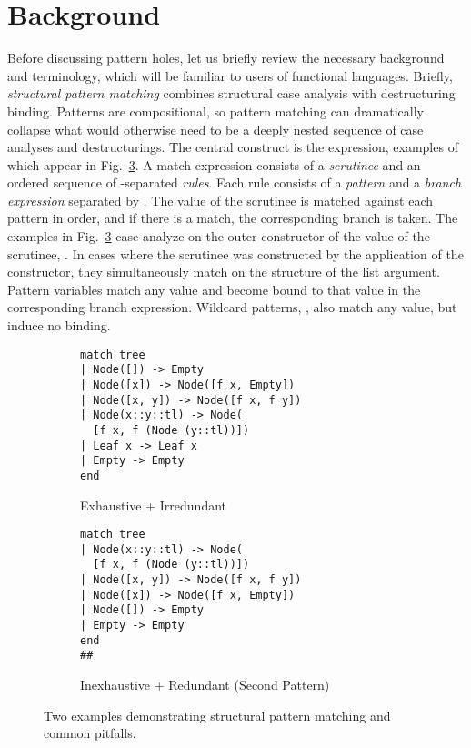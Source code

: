 \section{Background}
\label{sec:background}
Before discussing pattern holes, let us briefly review the necessary background and terminology, which will be familiar to users of functional languages. 
Briefly,
\emph{structural pattern matching} combines structural case analysis with destructuring binding. 
Patterns are compositional, so pattern matching can dramatically collapse what would otherwise 
need to be a deeply nested sequence of case analyses and destructurings. The central construct is the  expression, examples of which appear in  Fig.~\ref{fig:basic-examples}. A match expression consists of a \emph{scrutinee} and an ordered sequence of \li{|}-separated \emph{rules}. Each rule consists of a \emph{pattern} and a \emph{branch expression} separated by \li{->}. The value of the scrutinee is matched against each pattern in order, and if there is a match, the corresponding branch is taken. The examples in  Fig.~\ref{fig:basic-examples} 
case analyze on the outer constructor of the value of the {scrutinee}, . In cases where the scrutinee was constructed by the application of the  constructor, they simultaneously match on the structure of the list argument. Pattern variables match any value and become bound to that value in the corresponding branch expression. Wildcard patterns, \li{_}, also match any value, but induce no binding.

\begin{figure}
\begin{subfigure}{.45\textwidth}
\begin{lstlisting}[numbers=none]
match tree
| Node([]) -> Empty
| Node([x]) -> Node([f x, Empty])
| Node([x, y]) -> Node([f x, f y])
| Node(x::y::tl) -> Node(
  [f x, f (Node (y::tl))])
| Leaf x -> Leaf x
| Empty -> Empty
end\end{lstlisting}
\vspace{-6px}
\caption{Exhaustive + Irredundant\label{fig:basic-examples-correct}}
\end{subfigure}
\begin{subfigure}{.5\textwidth}
\begin{lstlisting}[numbers=none]
match tree
| Node(x::y::tl) -> Node(
  [f x, f (Node (y::tl))])
| Node([x, y]) -> Node([f x, f y])
| Node([x]) -> Node([f x, Empty])
| Node([]) -> Empty
| Empty -> Empty
end
##\end{lstlisting}
\vspace{-6px}
\caption{Inexhaustive + Redundant (Second Pattern)\label{fig:basic-examples-wrong}}
\end{subfigure}
\vspace{-3px}
\caption{Two examples demonstrating structural pattern matching and common pitfalls.}
\vspace{-4px}
\label{fig:basic-examples}
\end{figure}

